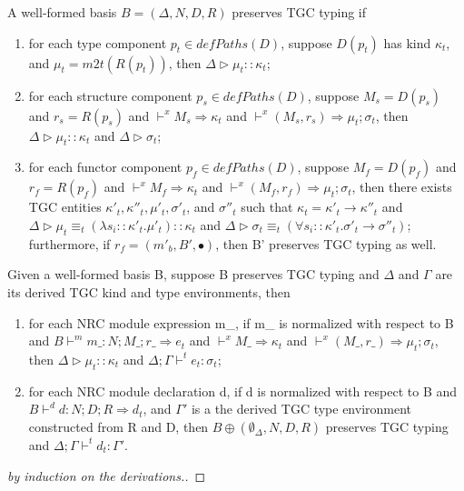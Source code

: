 \begin{definition}
A well-formed basis $B=(\Delta,N,D,R)$ preserves TGC typing if
\begin{enumerate}
\item for each type component $p_t \in defPaths(D)$, suppose $D(p_t)$ has kind $\kappa_t$, and $\mu_t = m2t(R(p_t))$, then $\Delta \triangleright \mu_t ::\kappa_t$;
\item for each structure component $p_s \in defPaths(D)$, suppose $M_s = D(p_s)$ and $r_s = R(p_s)$ and $\vdash^x M_s \Rightarrow \kappa_t$ and $\vdash^x (M_s, r_s) \Rightarrow \mu_t;\sigma_t$, then $\Delta\triangleright \mu_t::\kappa_t$ and $\Delta\triangleright\sigma_t$;
\item for each functor component $p_f \in defPaths(D)$, suppose $M_f = D(p_f)$ and $r_f = R(p_f)$ and $\vdash^x M_f \Rightarrow \kappa_t$ and $\vdash^x (M_f,r_f) \Rightarrow \mu_t;\sigma_t$, then there exists TGC entities $\kappa'_t, \kappa''_t, \mu'_t, \sigma'_t$, and $\sigma''_t$ such that $\kappa_t = \kappa'_t \to \kappa''_t$ and $\Delta \triangleright \mu_t \equiv_t (\lambda s_i::\kappa'_t.\mu'_t)::\kappa_t$ and $\Delta\triangleright \sigma_t \equiv_t (\forall s_i::\kappa'_t.\sigma'_t\to\sigma''_t)$; furthermore, if $r_f = (m'_b, B',\bullet)$, then B' preserves TGC typing as well. 
\end{enumerate}
\end{definition}

\begin{theorem}
Given a well-formed basis B, suppose B preserves TGC typing and $\Delta$ and $\Gamma$ are its derived TGC kind and type environments, then
\begin{enumerate}
\item for each NRC module expression m\_, if m\_ is normalized with respect to B and $B \vdash^m m\_: N; M\_; r\_ \Rightarrow e_t$ and $\vdash^x M\_ \Rightarrow \kappa_t$ and $\vdash^x (M\_,r\_) \Rightarrow \mu_t;\sigma_t$, then $\Delta\triangleright\mu_t::\kappa_t$ and $\Delta;\Gamma\vdash^t e_t : \sigma_t$;
\item for each NRC module declaration d, if d is normalized with respect to B and $B\vdash^d d: N;D;R \Rightarrow d_t$, and $\Gamma'$ is a the derived TGC type environment constructed from R and D, then $B\oplus(\emptyset_\Delta,N,D,R)$ preserves TGC typing and $\Delta;\Gamma\vdash^t d_t:\Gamma'$. 
\end{enumerate}
\end{theorem}
\begin{proof}[by induction on the derivations.]
\end{proof}

